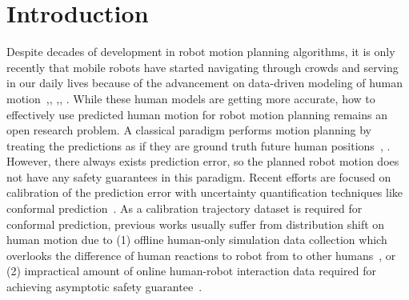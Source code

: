 \section{Introduction}
Despite decades of development in robot motion planning algorithms, it is only recently that mobile robots have started navigating through crowds and serving in our daily lives because of the advancement on data-driven modeling of human motion~\cite{hart1968formal},\cite{karaman2011sampling}, \cite{bemporad2007robust},\cite{alahi2016social}, \cite{huang2022learning}. While these human models are getting more accurate, how to effectively use predicted human motion for robot motion planning remains an open research problem. A classical paradigm performs motion planning by treating the predictions as if they are ground truth future human positions~\cite{huang2023neural}, \cite{liu2023intention}. However, there always exists prediction error, so the planned robot motion does not have any safety guarantees in this paradigm. Recent efforts are focused on calibration of the prediction error with uncertainty quantification techniques like conformal prediction~\cite{vovk2005cp}. As a calibration trajectory dataset is required for conformal prediction, previous works usually suffer from distribution shift on human motion due to (1) offline human-only simulation data collection which overlooks the difference of human reactions to robot from to other humans~\cite{lindemann2023safe}, or (2) impractical amount of online human-robot interaction data required for achieving asymptotic safety guarantee~\cite{dixit2023adaptive}.

